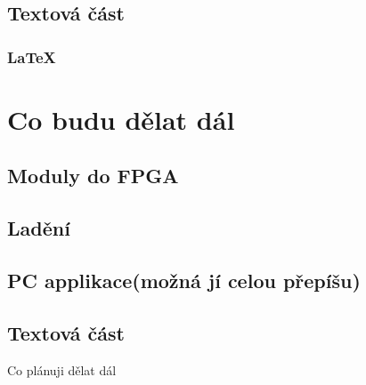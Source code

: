 \documentclass{beamer}
\begin{document}
\subsection{Textová část}
\subsubsection{LaTeX}


\section{Co budu dělat dál}

\subsection{Moduly do FPGA}
\subsection{Ladění}
\subsection{PC applikace(možná jí celou přepíšu)}
\subsection{Textová část}



\begin{frame}{Co plánuji dělat dál}
\end{frame}
\end{document}
